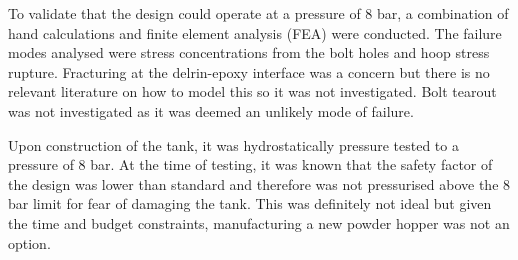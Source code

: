 To validate that the design could operate at a pressure of 8 bar, a combination of hand calculations and finite element analysis (FEA) were conducted. The failure modes analysed were stress concentrations from the bolt holes and hoop stress rupture. Fracturing at the delrin-epoxy interface was a concern but there is no relevant literature on how to model this so it was not investigated. Bolt tearout was not investigated as it was deemed an unlikely mode of failure.

Upon construction of the tank, it was hydrostatically pressure tested to a pressure of 8 bar. At the time of testing, it was known that the safety factor of the design was lower than standard and therefore was not pressurised above the 8 bar limit for fear of damaging the tank. This was definitely not ideal but given the time and budget constraints, manufacturing a new powder hopper was not an option.

